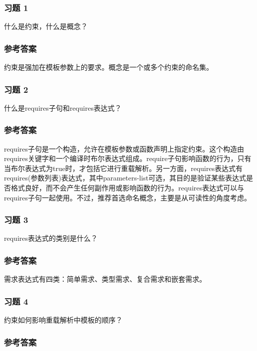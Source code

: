 \subsubsection{习题 1}

什么是约束，什么是概念？

\subsubsection{参考答案}

约束是强加在模板参数上的要求。概念是一个或多个约束的命名集。


\subsubsection{习题 2}

什么是requires子句和requires表达式？

\subsubsection{参考答案}

requires子句是一个构造，允许在模板参数或函数声明上指定约束。这个构造由requires关键字和一个编译时布尔表达式组成。require子句影响函数的行为，只有当布尔表达式为true时，才包括它进行重载解析。另一方面，requires表达式有requires(参数列表)表达式，其中parameters-list可选，其目的是验证某些表达式是否格式良好，而不会产生任何副作用或影响函数的行为。requires表达式可以与requires子句一起使用。不过，推荐首选命名概念，主要是从可读性的角度考虑。

\subsubsection{习题 3}

requires表达式的类别是什么？

\subsubsection{参考答案}

需求表达式有四类：简单需求、类型需求、复合需求和嵌套需求。

\subsubsection{习题 4}

约束如何影响重载解析中模板的顺序？

\subsubsection{参考答案}


